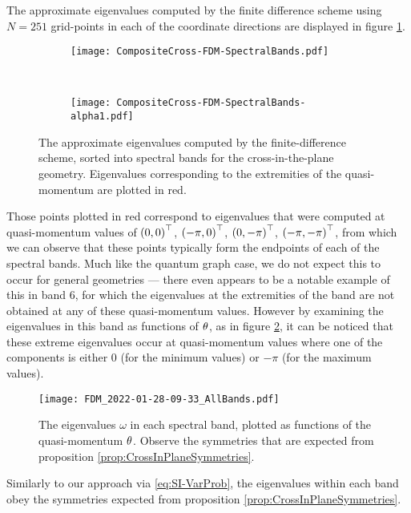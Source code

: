 The approximate eigenvalues computed by the finite difference scheme using $N=251$ grid-points in each of the coordinate directions are displayed in figure \ref{fig:CompositeCross-FDM-SpectralBands}.
\begin{figure}[b!]
	\centering
	\begin{subfigure}[t]{0.45\textwidth}
		\centering
		\texttt{[image: CompositeCross-FDM-SpectralBands.pdf]}
	\end{subfigure}
	~
	\begin{subfigure}[t]{0.45\textwidth}
		\centering
		\texttt{[image: CompositeCross-FDM-SpectralBands-alpha1.pdf]}
	\end{subfigure}
	\caption{\label{fig:CompositeCross-FDM-SpectralBands} The approximate eigenvalues computed by the finite-difference scheme, sorted into spectral bands for the cross-in-the-plane geometry. Eigenvalues corresponding to the extremities of the quasi-momentum are plotted in red.}
\end{figure}
Those points plotted in red correspond to eigenvalues that were computed at quasi-momentum values of $\left( 0,0 \right)^\top$, $\left( -\pi,0 \right)^\top$, $\left( 0,-\pi \right)^\top$, $\left( -\pi,-\pi \right)^\top$, from which we can observe that these points typically form the endpoints of each of the spectral bands.
Much like the quantum graph case, we do not expect this to occur for general geometries --- there even appears to be a notable example of this in band 6, for which the eigenvalues at the extremities of the band are not obtained at any of these quasi-momentum values.
However by examining the eigenvalues in this band as functions of $\theta$, as in figure \ref{fig:FDM_2022-01-28-09-33_AllBands}, it can be noticed that these extreme eigenvalues occur at quasi-momentum values where one of the components is either 0 (for the minimum values) or $-\pi$ (for the maximum values).
\begin{figure}[b!]
	\centering
	\texttt{[image: FDM\_2022-01-28-09-33\_AllBands.pdf]}
	\caption{\label{fig:FDM_2022-01-28-09-33_AllBands} The eigenvalues $\omega$ in each spectral band, plotted as functions of the quasi-momentum $\theta$. Observe the symmetries that are expected from proposition \ref{prop:CrossInPlaneSymmetries}.}
\end{figure}
Similarly to our approach via \eqref{eq:SI-VarProb}, the eigenvalues within each band obey the symmetries expected from proposition \ref{prop:CrossInPlaneSymmetries}.

